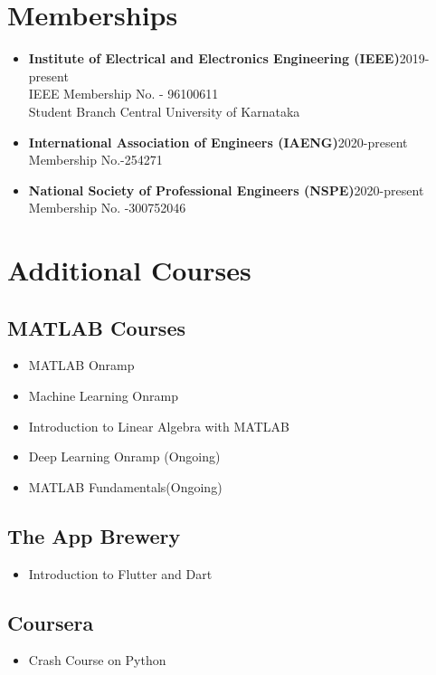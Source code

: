 \documentclass[]{article}
\begin{document}
    \section{Memberships}
    \begin{itemize}
        \item \textbf{Institute of Electrical and Electronics Engineering (IEEE)}\hspace{2.95cm}2019-present\\ IEEE Membership No. - 96100611\\ Student Branch Central University of Karnataka
        \item \textbf{International Association of Engineers (IAENG)}\hspace{4.66cm}2020-present\\ Membership No.-254271
        \item \textbf{National Society of Professional Engineers (NSPE)}\hspace{4.186cm}2020-present\\ Membership No. -300752046
    \end{itemize}
    \section{Additional Courses}
    \subsection{MATLAB Courses}
    \begin{itemize}
        \item MATLAB Onramp
        \item Machine Learning Onramp
        \item Introduction to Linear Algebra with MATLAB
        \item Deep Learning Onramp (Ongoing)
        \item MATLAB Fundamentals(Ongoing)
    \end{itemize}
    \subsection{The App Brewery}
    \begin{itemize}
        \item Introduction to Flutter and Dart
    \end{itemize}
    \subsection{Coursera}
    \begin{itemize}
        \item Crash Course on Python
    \end{itemize}
\end{document}
